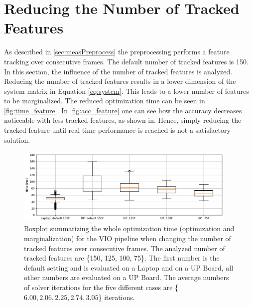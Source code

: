 \section{Reducing the Number of Tracked Features} \label{sec:reduceFeatures}
As described in \autoref{sec:measPreprocess} the preprocessing performs a 
feature tracking over consecutive frames. The default number of tracked 
features is 150. In this section, the influence of the number of tracked 
features is analyzed. Reducing the number of tracked features results in 
a lower dimension of the system matrix in Equation \eqref{eq:system}. This 
leads to a lower number of features to be marginalized. The reduced 
optimization time can be seen in \autoref{fig:time_feature}. In 
\autoref{fig:acc_feature} one can see how the accuracy decreases noticeable with 
less tracked features, as shown in. Hence, simply reducing the tracked feature 
until real-time performance is reached is not a satisfactory solution.
\begin{figure}[H]
\centering
\includegraphics[width=0.95\textwidth]{images/time_features}
\caption{Boxplot summarizing the whole optimization time (optimization and 
marginalization) for the \ac{VIO} 
pipeline when changing the number of tracked features over consecutive frames.
The analyzed number of tracked features are \{150, 125, 100, 75\}. The first 
number is the default setting and is evaluated on a Laptop and on a UP Board, 
all other numbers are evaluated on a UP Board. The average numbers of solver 
iterations for the five different cases are \{$6.00, 2.06, 2.25, 2.74, 3.05$\} 
iterations.}
\label{fig:time_feature}
\end{figure}
